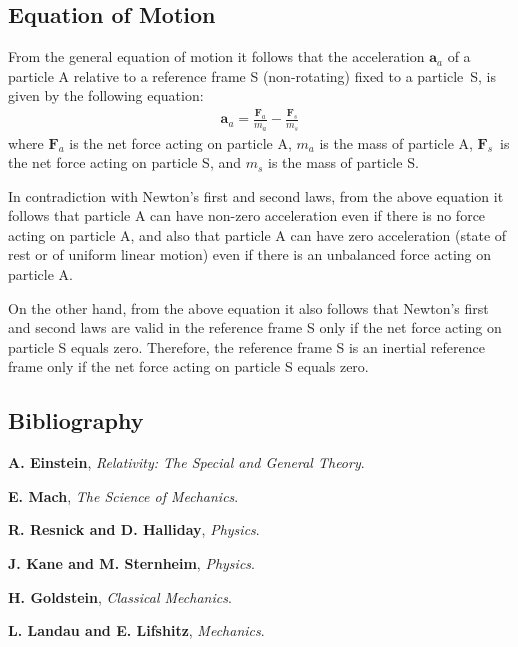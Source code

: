 \documentclass[10pt]{article}
\newcommand{\vA}{\mathbf{a}}
\newcommand{\vF}{\mathbf{F}}
\newcommand{\mM}{m}
\newcommand{\ra}{_a}
\newcommand{\rs}{_s}
\begin{document}
\newpage

{\centering\subsection*{Equation of Motion}}

\par From the general equation of motion it follows that the acceleration $\vA\ra$ of a particle A relative to a reference frame S (non-rotating) fixed to a \hbox {particle S}, is given by the following equation:
\begin{eqnarray*}
\vA\ra = \frac{\vF\ra}{\mM\ra} - \frac{\vF\rs}{\mM\rs}
\end{eqnarray*}
\noindent where $\vF\ra$ is the net force acting on particle A, $\mM\ra$ is the mass of particle A, \hbox {$\vF\rs$ is} the net force acting on particle S, and $\mM\rs$ is the mass of particle S.
\smallskip
\par In contradiction with Newton's first and second laws, from the above equation it follows that particle A can have non-zero acceleration even if there is no force acting on particle A, and also that particle A can have zero acceleration (state of rest or of uniform linear motion) even if there is an unbalanced force acting on particle A.
\smallskip
\par On the other hand, from the above equation it also follows that Newton's first and second laws are valid in the reference frame S only if the net force acting on particle S equals zero. Therefore, the reference frame S is an inertial reference frame only if the net force acting on particle S equals zero.

\vspace{+0.6em}

{\centering\subsection*{Bibliography}}

\vspace{+0.3em}

\par \textbf{A. Einstein}, \textit{Relativity: The Special and General Theory}.
\medskip
\par \textbf{E. Mach}, \textit{The Science of Mechanics}.
\medskip
\par \textbf{R. Resnick and D. Halliday}, \textit{Physics}.
\medskip
\par \textbf{J. Kane and M. Sternheim}, \textit{Physics}.
\medskip
\par \textbf{H. Goldstein}, \textit{Classical Mechanics}.
\medskip
\par \textbf{L. Landau and E. Lifshitz}, \textit{Mechanics}.
\end{document}
